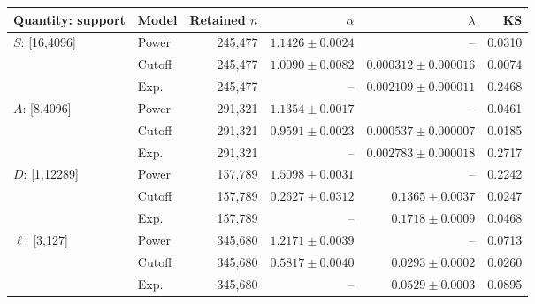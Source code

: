 \begin{tabular}{@{}llrrrr@{}}
\toprule
Quantity: support & Model & Retained $n$ & $\alpha$ & $\lambda$ & KS \\
\midrule
$S$: [16,4096] & Power & 245,477 & $1.1426 \pm 0.0024$ & -- & 0.0310 \\
 & Cutoff & 245,477 & $1.0090 \pm 0.0082$ & $0.000312 \pm 0.000016$ & 0.0074 \\
 & Exp. & 245,477 & -- & $0.002109 \pm 0.000011$ & 0.2468 \\
$A$: [8,4096] & Power & 291,321 & $1.1354 \pm 0.0017$ & -- & 0.0461 \\
 & Cutoff & 291,321 & $0.9591 \pm 0.0023$ & $0.000537 \pm 0.000007$ & 0.0185 \\
 & Exp. & 291,321 & -- & $0.002783 \pm 0.000018$ & 0.2717 \\
$D$: [1,12289] & Power & 157,789 & $1.5098 \pm 0.0031$ & -- & 0.2242 \\
 & Cutoff & 157,789 & $0.2627 \pm 0.0312$ & $0.1365 \pm 0.0037$ & 0.0247 \\
 & Exp. & 157,789 & -- & $0.1718 \pm 0.0009$ & 0.0468 \\
$\ell$: [3,127] & Power & 345,680 & $1.2171 \pm 0.0039$ & -- & 0.0713 \\
 & Cutoff & 345,680 & $0.5817 \pm 0.0040$ & $0.0293 \pm 0.0002$ & 0.0260 \\
 & Exp. & 345,680 & -- & $0.0529 \pm 0.0003$ & 0.0895 \\
\bottomrule
\end{tabular}
